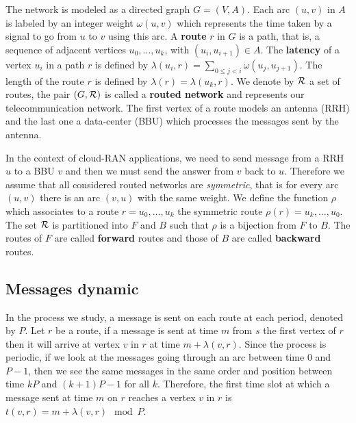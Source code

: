 \documentclass[10pt, conference, letterpaper]{IEEEtran}
\begin{document}
The network is modeled as a directed graph $G=(V,A)$. Each arc  $(u,v)$ in $A$ is labeled by an integer weight $\omega(u,v)$ which represents the time taken by a signal to go from $u$ to $v$ using this arc. A {\bf route} $r$ in $G$ is a path, that is, a sequence of adjacent vertices $u_0, \ldots , u_{k}$, with $(u_i,u_{i+1}) \in A$.  The {\bf latency} of a vertex $u_i$ in a path $r$ is defined by $\lambda(u_i,r)= \sum\limits_{0 \leq j <i} \omega(u_j, u_{j+1})$.
The length of the route $r$ is defined by $\lambda (r)= \lambda (u_k,r)$.
We denote by $\cal R$ a set of routes, the pair $(G,\cal R)$ is called a {\bf routed network} and represents our telecommunication network. The first vertex of a route models an antenna (RRH) and the last one a data-center (BBU) which processes the messages sent by the antenna.

   In the context of cloud-RAN applications, we need to send message from a RRH $u$ to a BBU $v$ and then 
      we must send the answer from $v$ back to $u$. Therefore we assume that all considered routed networks 
      are \emph{symmetric}, that is for every arc $(u,v)$ there is an arc $(v,u)$ with the same weight.
      We define the function $\rho$ which associates to a route $r = u_0,\dots,u_k$ the symmetric route $\rho(r) = u_k,\dots,u_0$.
      The set ${\cal R}$ is partitioned into $F$ and $B$ such that $\rho$ is a bijection from $F$ to $B$.
      The routes of $F$ are called \textbf{forward} routes and those of $B$ are called \textbf{backward} routes.
%       
      


   \subsection{Messages dynamic}
      
      
      In the process we study, a message is sent on each route at each period, denoted by $P$.
      Let $r$ be a route, if a message is sent at time $m$ from $s$ the first vertex of $r$ then it will arrive at vertex $v$ in $r$ at time $m + \lambda(v,r)$. Since the process is periodic, if we look at the messages going through an arc between time $0$ and $P-1$, then we see the same messages in the same order and position between time $kP$ and $(k+1)P -1$ for all $k$. 
      Therefore, the first time slot at which a message sent at time $m$ on $r$ reaches a vertex $v$ in $r$ is $t(v,r) = m + \lambda(v,r) \mod P$. 
      
\end{document}
